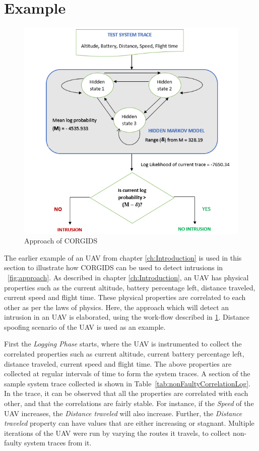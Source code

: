 \section{Example}

\begin{figure}[ht]
    \centering
    \includegraphics[scale=0.55,keepaspectratio = true]{Graphics/CORGIDSApproach.png}
    \caption{Approach of CORGIDS}
    \label{fig:approach}
\end{figure}

The earlier example of an UAV from chapter \ref{ch:Introduction} is used in this section to illustrate how CORGIDS can be used to detect intrusions in ~\autoref{fig:approach}. As described in chapter \ref{ch:Introduction}, an UAV has physical properties such as the current altitude, battery percentage left, distance traveled, current speed and flight time. These physical properties are correlated to each other as per the laws of physics. Here, the approach which will detect an intrusion in an UAV is elaborated, using the work-flow described in \ref{fig:approach}. Distance spoofing scenario of the UAV is used as an example.

First the \textit{Logging Phase} starts, where the UAV is instrumented to collect the correlated properties such as current altitude, current battery percentage left, distance traveled, current speed and flight time. The above properties are collected at regular intervals of time to form the system traces. A section of the sample system trace collected is shown in Table~\ref{tab:nonFaultyCorrelationLog}. In the trace, it can be observed that all the properties are correlated  with each other, and that the correlations are fairly stable. For instance, if the \textit{Speed} of the UAV increases, the \textit{Distance traveled} will also increase. Further, the \textit{Distance traveled} property can have values that are either increasing or stagnant. Multiple iterations of the UAV were run by varying the routes it travels, to collect non-faulty system traces from it.

